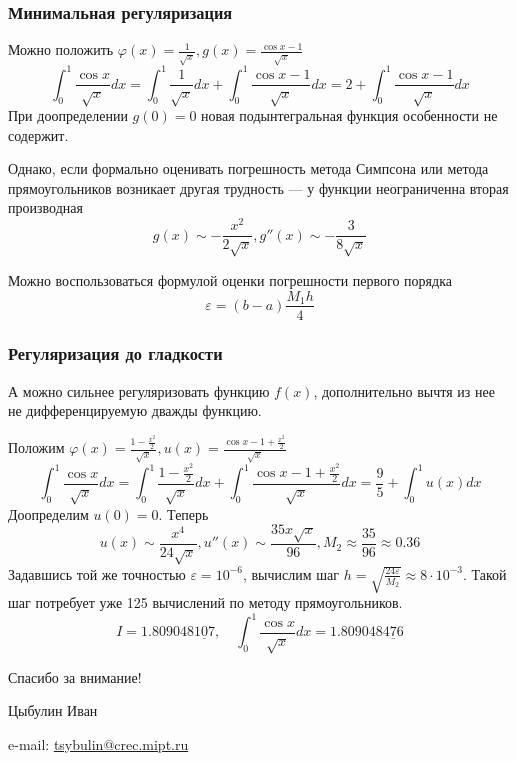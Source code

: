 \documentclass[apectratio=43,unicode]{beamer}
\newcommand{\colorhref}[2]{\href{#1}{\textcolor{miptbase!30!black}{#2}}}
\begin{document}
\begin{frame}
\frametitle{Минимальная регуляризация}
	Можно положить $\varphi(x) = \frac{1}{\sqrt{x}}, g(x) = \frac{\cos x - 1}{\sqrt{x}}$
	\[
	\int_0^1 \frac{\cos x}{\sqrt{x}} dx =
	\int_0^1 \frac{1}{\sqrt{x}} dx +
	\int_0^1 \frac{\cos x-1}{\sqrt{x}} dx = 2 + \int_0^1 \frac{\cos x-1}{\sqrt{x}} dx
	\]
	\pause
	При доопределении $g(0)=0$ новая подынтегральная функция особенности не содержит.
	\pause

	Однако, если формально оценивать погрешность метода Симпсона или метода прямоугольников возникает другая трудность ---
	у функции неограниченна вторая производная
	\[g(x) \sim -\frac{x^2}{2\sqrt{x}}, g''(x) \sim -\frac{3}{8\sqrt{x}}\]
	\pause

	Можно воспользоваться формулой оценки погрешности первого порядка
	\[
	\varepsilon = (b-a)\frac{M_1 h}{4}
	\]
\end{frame}

\begin{frame}
\frametitle{Регуляризация до гладкости}
	А можно сильнее регуляризовать функцию $f(x)$, дополнительно вычтя из нее
	не дифференцируемую дважды функцию.

	Положим $\varphi(x) = \frac{1-\frac{x^2}{2}}{\sqrt{x}}, u(x) = \frac{\cos x - 1 + \frac{x^2}{2}}{\sqrt{x}}$
	\[
	\int_0^1 \frac{\cos x}{\sqrt{x}} dx =
	\int_0^1 \frac{1-\frac{x^2}{2}}{\sqrt{x}} dx +
	\int_0^1 \frac{\cos x-1+\frac{x^2}{2}}{\sqrt{x}} dx = \frac{9}{5} + \int_0^1 u(x) dx
	\]
	\pause
	Доопределим $u(0) = 0$. Теперь
	\[u(x) \sim \frac{x^4}{24\sqrt{x}}, u''(x) \sim \frac{35x\sqrt{x}}{96}, M_2
	\approx \frac{35}{96} \approx 0.36\]
	\pause
	Задавшись той же точностью $\varepsilon = 10^{-6}$, вычислим шаг $h = \sqrt{\frac{24\varepsilon}{M_2}} \approx 8 \cdot 10^{-3}$.
	Такой шаг потребует уже 125 вычислений по методу прямоугольников. %
	\[
	I = 1.809048\underline{107}, \quad \int_0^1 \frac{\cos x}{\sqrt{x}} dx = 1.809048\underline{476}
	\]
\end{frame}

\begin{frame}[plain]
  \begin{center}
  {\Huge Спасибо за внимание!}
  \vspace{8ex}

  Цыбулин Иван

  e-mail: \colorhref{mailto:tsybulin@crec.mipt.ru}{tsybulin@crec.mipt.ru}
  \end{center}
\end{frame}
\end{document}
